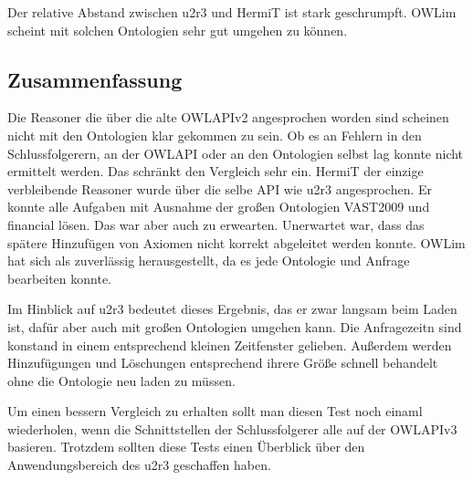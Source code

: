 Der relative Abstand zwischen u2r3 und HermiT ist stark geschrumpft. OWLim scheint mit solchen Ontologien sehr gut umgehen zu können.

\subsection{Zusammenfassung}
Die Reasoner die über die alte OWLAPIv2 angesprochen worden sind scheinen nicht mit den Ontologien klar gekommen zu sein. Ob es an Fehlern in den Schlussfolgerern, an der OWLAPI oder an den Ontologien selbst lag konnte nicht ermittelt werden. Das schränkt den Vergleich sehr ein. HermiT der einzige verbleibende Reasoner wurde über die selbe API wie u2r3 angesprochen. Er konnte alle Aufgaben mit Ausnahme der großen Ontologien VAST2009 und financial lösen. Das war aber auch zu erwearten. Unerwartet war, dass das spätere Hinzufügen von Axiomen nicht korrekt abgeleitet werden konnte. OWLim hat sich als zuverlässig herausgestellt, da es jede Ontologie und Anfrage bearbeiten konnte.

Im Hinblick auf u2r3 bedeutet dieses Ergebnis, das er zwar langsam beim Laden ist, dafür aber auch mit großen Ontologien umgehen kann. Die Anfragezeitn sind konstand in einem entsprechend kleinen Zeitfenster gelieben. Außerdem werden Hinzufügungen und Löschungen entsprechend ihrere Größe schnell behandelt ohne die Ontologie neu laden zu müssen.

Um einen bessern Vergleich zu erhalten sollt man diesen Test noch einaml wiederholen, wenn die Schnittstellen der Schlussfolgerer alle auf der OWLAPIv3 basieren. Trotzdem sollten diese Tests einen Überblick über den Anwendungsbereich des u2r3 geschaffen haben.


